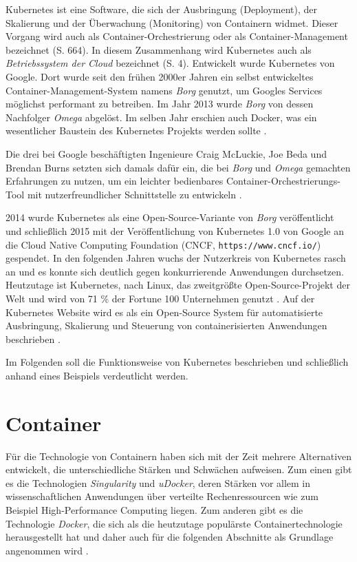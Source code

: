 \documentclass[11pt,a4paper]{article}
\begin{document}
Kubernetes ist eine Software, die sich der Ausbringung (Deployment), der Skalierung und der Überwachung (Monitoring) von Containern widmet.
Dieser Vorgang wird auch als Container-Orchestrierung oder als Container-Management bezeichnet \cite{Bisong2019} (S. 664).
In diesem Zusammenhang wird Kubernetes auch als \emph{Betriebssystem der Cloud} bezeichnet \cite{Schmeling_Dargatz_2022} (S. 4).
Entwickelt wurde Kubernetes von Google. Dort wurde seit den frühen 2000er Jahren ein selbst entwickeltes Container-Management-System namens \emph{Borg} genutzt,
um Googles Services möglichst performant zu betreiben.
Im Jahr 2013 wurde \emph{Borg} von dessen Nachfolger \emph{Omega} abgelöst. Im selben Jahr erschien auch Docker, was ein wesentlicher Baustein des Kubernetes
Projekts werden sollte \cite{ibm_history}.

Die drei bei Google beschäftigten Ingenieure Craig McLuckie, Joe Beda und Brendan Burns setzten sich damals dafür ein,
die bei \emph{Borg} und \emph{Omega} gemachten Erfahrungen zu nutzen, um ein leichter bedienbares Container-Orchestrierungs-Tool
mit nutzerfreundlicher Schnittstelle zu entwickeln \cite{ibm_history}.

2014 wurde Kubernetes als eine Open-Source-Variante von \emph{Borg} veröffentlicht und schließlich 2015 mit der Veröffentlichung von Kubernetes 1.0
von Google an die Cloud Native Computing Foundation (CNCF, \lstinline|https://www.cncf.io/|) gespendet. In den folgenden Jahren wuchs der Nutzerkreis von Kubernetes
rasch an und es konnte sich deutlich gegen konkurrierende Anwendungen durchsetzen.
Heutzutage ist Kubernetes, nach Linux, das zweitgrößte Open-Source-Projekt der Welt und wird von 71 \% der Fortune 100 Unternehmen genutzt
\cite{ibm_history} \cite{kubernetes_journey}.
Auf der Kubernetes Website wird es als ein Open-Source System für automatisierte Ausbringung, Skalierung
und Steuerung von containerisierten Anwendungen beschrieben \cite{kubernetes.io_start}.

Im Folgenden soll die Funktionsweise von Kubernetes beschrieben und schließlich anhand eines Beispiels
verdeutlicht werden.


\section{Container}
\label{sec:Container}

Für die Technologie von Containern haben sich mit der Zeit mehrere Alternativen entwickelt, die unterschiedliche
Stärken und Schwächen aufweisen. Zum einen gibt es die Technologien \emph{Singularity} und \emph{uDocker}, deren Stärken
vor allem in wissenschaftlichen Anwendungen über verteilte Rechenressourcen wie zum Beispiel High-Performance Computing
liegen. Zum anderen gibt es die Technologie \emph{Docker}, die sich als die heutzutage populärste Containertechnologie
herausgestellt hat und daher auch für die folgenden Abschnitte als Grundlage angenommen wird \cite{Bentaleb_Belloum_Sebaa_El-Maouhab_2021}.
\end{document}
